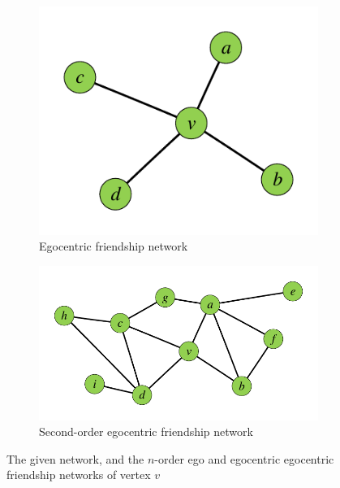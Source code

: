 \begin{figure}[t!]
\begin{subfigure}[b]{0.38\textwidth}
                \includegraphics[width=\textwidth]{./images/friends.pdf}
                \caption{Egocentric friendship network}
                \label{fig:1-d}
        \end{subfigure}
        \begin{subfigure}[b]{0.60\textwidth}
                \includegraphics[width=\textwidth]{./images/multi-oder-friends.pdf}
                \caption{Second-order egocentric friendship network}
                \label{fig:1-e}
        \end{subfigure}
        \caption{The given network, and the $n$-order ego and egocentric egocentric friendship networks of vertex $v$}
        \label{fig:1}
\end{figure}

